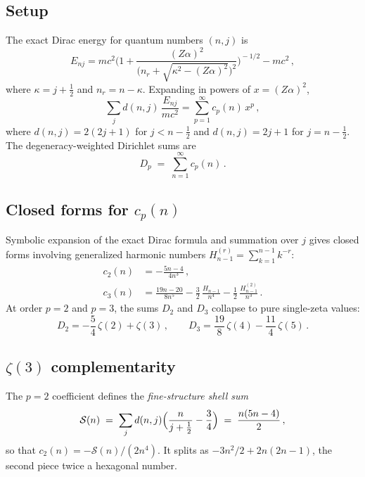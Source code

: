 \documentclass[11pt]{article}
\begin{document}
\subsection{Setup}

The exact Dirac energy for quantum numbers $(n,j)$ is
\begin{equation}
  E_{nj} = mc^2 \biggl(
    1 + \frac{(Z\alpha)^2}
    {\bigl(n_r + \sqrt{\kappa^2 - (Z\alpha)^2}\bigr)^2}
  \biggr)^{\!-1/2} - mc^2\,,
\end{equation}
where $\kappa = j + \frac{1}{2}$ and $n_r = n - \kappa$.
Expanding in powers of $x = (Z\alpha)^2$,
\begin{equation}
  \sum_j d(n,j)\, \frac{E_{nj}}{mc^2}
  = \sum_{p=1}^{\infty} c_p(n)\, x^p\,,
\end{equation}
where $d(n,j) = 2(2j+1)$ for $j < n - \tfrac{1}{2}$ and
$d(n,j) = 2j+1$ for $j = n - \tfrac{1}{2}$.
The degeneracy-weighted Dirichlet sums are
\begin{equation}
  D_p \;=\; \sum_{n=1}^{\infty} c_p(n)\,.
\end{equation}

\subsection{Closed forms for $c_p(n)$}

Symbolic expansion of the exact Dirac formula and summation over $j$
gives closed forms involving generalized harmonic numbers
$H_{n-1}^{(r)} = \sum_{k=1}^{n-1} k^{-r}$:
\begin{align}
  c_2(n) &= -\frac{5n - 4}{4n^3}\,, \\[3pt]
  c_3(n) &= \frac{19n-20}{8n^5}
    - \frac{3}{2}\,\frac{H_{n-1}}{n^4}
    - \frac{1}{2}\,\frac{H_{n-1}^{(2)}}{n^3}\,.
\end{align}
At order $p = 2$ and $p = 3$, the sums $D_2$ and $D_3$ collapse to
pure single-zeta values:
\begin{equation}
  D_2 = -\frac{5}{4}\,\zeta(2) + \zeta(3)\,,
  \qquad
  D_3 = \frac{19}{8}\,\zeta(4) - \frac{11}{4}\,\zeta(5)\,.
\end{equation}

\subsection{$\zeta(3)$ complementarity}

The $p = 2$ coefficient defines the \emph{fine-structure shell sum}
\begin{equation}
  \mathcal{S}(n) \;=\; \sum_j d(n,j)\Bigl(\frac{n}{j+\frac{1}{2}}
  - \frac{3}{4}\Bigr) \;=\; \frac{n(5n-4)}{2}\,,
\end{equation}
so that $c_2(n) = -\mathcal{S}(n)/(2n^4)$.
It splits as $-3n^2/2 + 2n(2n-1)$, the second piece twice a hexagonal
number.
\end{document}
